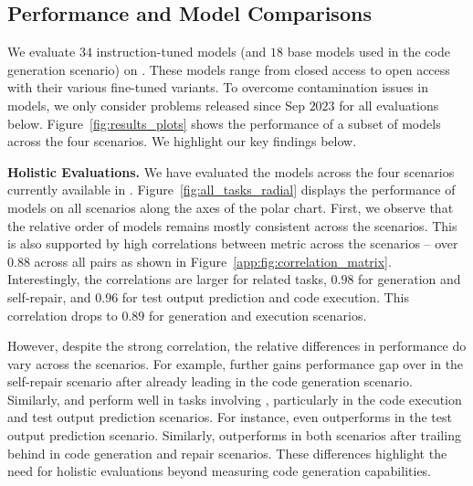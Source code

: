 


\subsection{Performance and Model Comparisons}
\label{subsec:model_comparisions}
We evaluate $34$ instruction-tuned models (and $18$ base models used in the code generation scenario) on \livecodebench{}.
These models range from closed access to open access with their various fine-tuned variants.
To overcome contamination issues in \deepseek{} models, we only consider problems released since Sep $2023$ for all evaluations below.
Figure~\ref{fig:results_plots} shows the performance of a subset of models across the four scenarios. 
We highlight our key findings below.

\vspace{1.5pt}
\noindent \textbf{Holistic Evaluations.}
We have evaluated the models across the four scenarios currently available in \livecodebench{}.
Figure~\ref{fig:all_tasks_radial} displays the performance of models on all scenarios along the axes of the polar chart.
First, we observe that the relative order of models remains mostly consistent across the scenarios.
This is also supported by high correlations between  metric across the scenarios -- 
over $0.88$ across all pairs as shown in Figure~\ref{app:fig:correlation_matrix}.
Interestingly, the correlations are larger for related tasks, $0.98$ for generation and self-repair, and $0.96$ for test output prediction and code execution. 
This correlation drops to $0.89$ for generation and execution scenarios.

However, despite the strong correlation, the relative differences in performance do vary across the scenarios.
For example, \gptfourturbo{} further gains performance gap over \gptfour{} in the self-repair scenario after already leading in the code generation scenario.
Similarly, \claudeopus{} and \mistrallarge{} perform well in tasks involving \chainot{}, particularly in the code execution and test output prediction scenarios.
For instance, \claudeopus{} even outperforms \gptfourturbo{} in the test output prediction scenario.
Similarly, \mistrallarge{} outperforms \claudesonnet{} in both scenarios after trailing behind in code generation and repair scenarios.
These differences highlight the need for holistic evaluations beyond measuring code generation capabilities.



